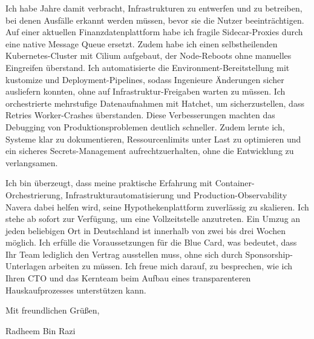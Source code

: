 \documentclass[11pt,a4paper]{coverletter}
\begin{document}
Ich habe Jahre damit verbracht, Infrastrukturen zu entwerfen und zu betreiben, bei denen Ausfälle erkannt werden müssen, bevor sie die Nutzer beeinträchtigen. Auf einer aktuellen Finanzdatenplattform habe ich fragile Sidecar-Proxies durch eine native Message Queue ersetzt. Zudem habe ich einen selbstheilenden Kubernetes-Cluster mit Cilium aufgebaut, der Node-Reboots ohne manuelles Eingreifen überstand. Ich automatisierte die Environment-Bereitstellung mit kustomize und Deployment-Pipelines, sodass Ingenieure Änderungen sicher ausliefern konnten, ohne auf Infrastruktur-Freigaben warten zu müssen. Ich orchestrierte mehrstufige Datenaufnahmen mit Hatchet, um sicherzustellen, dass Retries Worker-Crashes überstanden. Diese Verbesserungen machten das Debugging von Produktionsproblemen deutlich schneller. Zudem lernte ich, Systeme klar zu dokumentieren, Ressourcenlimits unter Last zu optimieren und ein sicheres Secrets-Management aufrechtzuerhalten, ohne die Entwicklung zu verlangsamen.

Ich bin überzeugt, dass meine praktische Erfahrung mit Container-Orchestrierung, Infrastrukturautomatisierung und Production-Observability Navera dabei helfen wird, seine Hypothekenplattform zuverlässig zu skalieren. Ich stehe ab sofort zur Verfügung, um eine Vollzeitstelle anzutreten. Ein Umzug an jeden beliebigen Ort in Deutschland ist innerhalb von zwei bis drei Wochen möglich. Ich erfülle die Voraussetzungen für die Blue Card, was bedeutet, dass Ihr Team lediglich den Vertrag ausstellen muss, ohne sich durch Sponsorship-Unterlagen arbeiten zu müssen. Ich freue mich darauf, zu besprechen, wie ich Ihren CTO und das Kernteam beim Aufbau eines transparenteren Hauskaufprozesses unterstützen kann.

\closing{Mit freundlichen Grüßen,}{Radheem Bin Razi}
\end{document}
